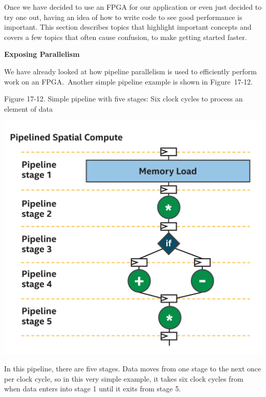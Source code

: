 Once we have decided to use an FPGA for our application or even just decided to try one out, having an idea of how to write code to see good performance is important. This section describes topics that highlight important concepts and covers a few topics that often cause confusion, to make getting started faster.\par

\hspace*{\fill} \par %
\textbf{Exposing Parallelism}

We have already looked at how pipeline parallelism is used to efficiently perform work on an FPGA. Another simple pipeline example is shown in Figure 17-12.\par

\hspace*{\fill} \par %
Figure 17-12. Simple pipeline with five stages: Six clock cycles to process an element of data
\begin{center}
	\includegraphics[width=1.0\textwidth]{content/chapter-17/images/11}
\end{center}

In this pipeline, there are five stages. Data moves from one stage to the next once per clock cycle, so in this very simple example, it takes six clock cycles from when data enters into stage 1 until it exits from stage 5.\par

